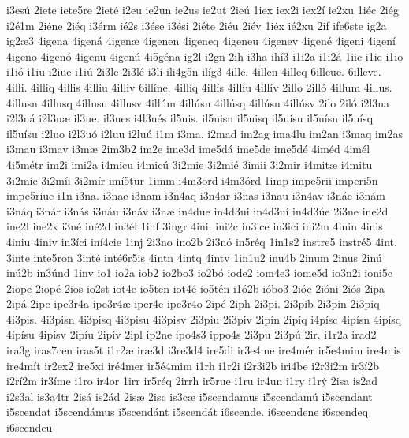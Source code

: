 {i3es^^fa
2iete
iete5re
2iet^^e9
i2eu
ie2un
ie2us
ie2ut
2ie^^fa
1iex
iex2i
iex2^^ed
ie2xu
1i^^e9c
2i^^e9g
i2^^e91m
2i^^e9ne
2i^^e9q
i3^^e9rm
i^^e92s
i3^^e9se
i3^^e9si
2i^^e9te
2i^^e9u
2i^^e9v
1i^^e9x
i^^e92xu
2if
ife6ste
ig2a
ig2^^e63
4igena
4igen^^e1
4igen^^e6
4igenen
4igeneq
4igeneu
4igenev
4igen^^e9
4igeni
4igen^^ed
4igeno
4igen^^f3
4igenu
4igen^^fa
4i5g^^e9na
ig2l
i2gn
2ih
i3ha
ih^^ed3
i1i2a
i1i2^^e1
1iic
i1ie
i1io
i1i^^f3
i1iu
i2iue
i1i^^fa
2i3le
2i3l^^e9
i3li
ili4g5n
il^^edg3
4ille.
4illen
4illeq
6illeue.
6illeve.
4illi.
4illiq
4illis
4illiu
4illiv
6ill^^edne.
4ill^^edq
4ill^^eds
4ill^^edu
4ill^^edv
2illo
2ill^^f3
4illum
4illus.
4illusn
4illusq
4illusu
4illusv
4ill^^fam
4ill^^fasn
4ill^^fasq
4ill^^fasu
4ill^^fasv
2ilo
2il^^f3
i2l3ua
i2l3u^^e1
i2l3u^^e6
il3ue.
il3ues
i4l3u^^e9s
il5uis.
il5uisn
il5uisq
il5uisu
il5u^^edsn
il5u^^edsq
il5u^^edsu
i2luo
i2l3u^^f3
i2luu
i2lu^^fa
i1m
i3ma.
i2mad
im2ag
ima4lu
im2an
i3maq
im2as
i3mau
i3mav
i3m^^e6
2im3b2
im2e
ime3d
ime5d^^e1
ime5de
ime5d^^e9
4im^^e9d
4im^^e9l
4i5m^^e9tr
im2i
imi2a
i4micu
i4mic^^fa
3i2mie
3i2mi^^e9
3imii
3i2mir
i4mit^^e6
i4mitu
3i2m^^edc
3i2m^^edi
3i2m^^edr
im^^ed5tur
1imm
i4m3ord
i4m3^^f3rd
1imp
impe5rii
imperi5n
impe5riue
i1n
i3na.
i3nae
i3nam
i3n4aq
i3n4ar
i3nas
i3nau
i3n4av
i3n^^e1e
i3n^^e1m
i3n^^e1q
i3n^^e1r
i3n^^e1s
i3n^^e1u
i3n^^e1v
i3n^^e6
in4due
in4d3ui
in4d3u^^ed
in4d3^^fae
2i3ne
ine2d
ine2l
ine2x
i3n^^e9
in^^e92d
in3^^e9l
1inf
3ingr
4ini.
ini2c
in3ice
in3ici
ini2m
4inin
4inis
4iniu
4iniv
in3^^edci
in^^ed4cie
1inj
2i3no
ino2b
2i3n^^f3
in5r^^e9q
1in1s2
instre5
instr^^e95
4int.
3inte
inte5ron
3int^^e9
int^^e96r5is
4intn
4intq
4intv
1in1u2
inu4b
2inum
2inus
2in^^fa
in^^fa2b
in3^^fand
1inv
io1
io2a
iob2
io2bo3
io2b^^f3
iode2
iom4e3
iome5d
io3n2i
ioni5c
2iope
2iop^^e9
2ios
io2st
iot4e
io5ten
iot4^^e9
io5t^^e9n
i1^^f32b
i^^f3bo3
2i^^f3c
2i^^f3ni
2i^^f3s
2ipa
2ip^^e1
2ipe
ipe3r4a
ipe3r4^^e6
iper4e
ipe3r4o
2ip^^e9
2iph
2i3pi.
2i3pib
2i3pin
2i3piq
4i3pis.
4i3pisn
4i3pisq
4i3pisu
4i3pisv
2i3piu
2i3piv
2ip^^edn
2ip^^edq
i4p^^edsc
4ip^^edsn
4ip^^edsq
4ip^^edsu
4ip^^edsv
2ip^^edu
2ip^^edv
2ipl
ip2ne
ipo4s3
ippo4s
2i3pu
2i3p^^fa
2ir.
i1r2a
irad2
ira3g
iras7cen
iras5t
i1r2^^e6
ir^^e63d
i3re3d4
ire5di
ir3e4me
ire4m^^e9r
ir5e4mim
ire4mis
ire4m^^edt
ir2ex2
ire5xi
ir^^e94mer
ir5^^e94mim
i1rh
i1r2i
i2r3i2b
iri4be
i2r3i2m
ir3^^ed2b
i2r^^ed2m
ir3^^edme
i1ro
ir4or
1irr
ir5r^^e9q
2irrh
ir5rue
i1ru
ir4un
i1ry
i1r^^fd
2isa
is2ad
i2s3al
is3a4tr
2is^^e1
is2^^e1d
2is^^e6
2isc
is3c^^e6
i5scendamus
i5scendam^^fa
i5scendant
i5scendat
i5scend^^e1mus
i5scend^^e1nt
i5scend^^e1t
i6scende.
i6scendene
i6scendeq
i6scendeu
}

